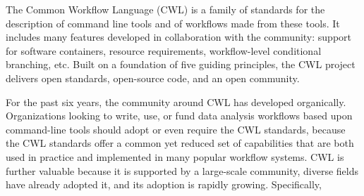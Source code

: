 \documentclass[
]{article}
\begin{document}
The Common Workflow Language (CWL) is a family of standards for the
description of command line tools and of workflows made from these
tools. It includes many features developed in collaboration with the
community: support for software containers, resource requirements,
workflow-level conditional branching, etc. Built on a foundation of five
guiding principles, the CWL project delivers open standards, open-source
code, and an open community.

For the past six years, the community around CWL has developed
organically. Organizations looking to write, use, or fund data analysis
workflows based upon command-line tools should adopt or even require the
CWL standards, because the CWL standards offer a common yet reduced set
of capabilities that are both used in practice and implemented in many
popular workflow systems. CWL is further valuable because it is
supported by a large-scale community, diverse fields have already
adopted it, and its adoption is rapidly growing. Specifically,
\end{document}
